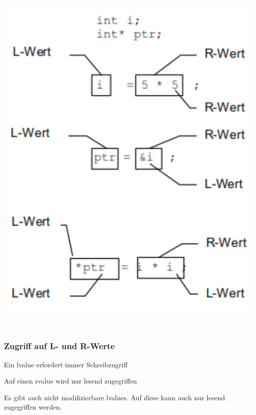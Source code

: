 				\begin{minipage}[t]{5 cm}
					\vspace*{-0.2cm}
					\includegraphics[width=1\textwidth]{pics/l-r-wert1.png}
					\includegraphics[width=1\textwidth]{pics/l-r-wert2.png}
				\end{minipage}\\
				\subsubsection{Zugriff auf L- und R-Werte}
					\begin{compactitem}
						\item Ein lvalue erfordert immer Schreibzugriff
						\item Auf einen rvalue wird nur lesend zugegriffen
						\item Es gibt auch nicht modifizierbare lvalues. Auf diese kann auch nur lesend zugegriffen werden.
					\end{compactitem}

